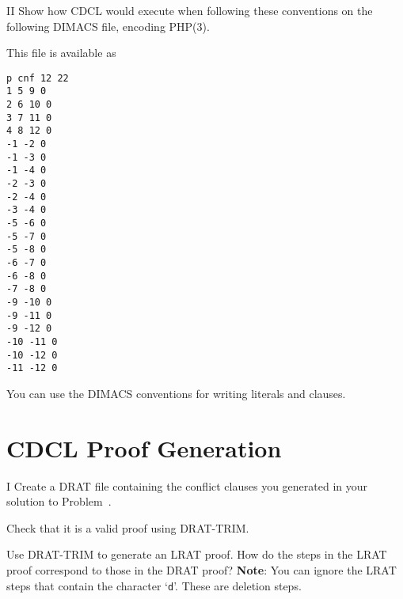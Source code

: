 \begin{problem}{II}
  Show how CDCL would execute when following these conventions on the following
  DIMACS file, encoding PHP(3).

  This file is available as 
\begin{lstlisting}
p cnf 12 22
1 5 9 0
2 6 10 0
3 7 11 0
4 8 12 0
-1 -2 0
-1 -3 0
-1 -4 0
-2 -3 0
-2 -4 0
-3 -4 0
-5 -6 0
-5 -7 0
-5 -8 0
-6 -7 0
-6 -8 0
-7 -8 0
-9 -10 0
-9 -11 0
-9 -12 0
-10 -11 0
-10 -12 0
-11 -12 0
\end{lstlisting}
  You can use the DIMACS conventions for writing literals and clauses.
  
\end{problem}

\newpage

\section*{CDCL Proof Generation}


\begin{problem}{I}
Create a DRAT file containing the conflict clauses you generated in your solution to Problem~.
\begin{choice}
\item
Check that it is a valid proof using DRAT-TRIM.
\item
Use DRAT-TRIM to generate an LRAT proof.  How do the steps in the LRAT proof correspond to those in the DRAT proof?
{\bf Note}: You can ignore the LRAT steps that contain the character `\texttt{d}'.  These are deletion steps.
\end{choice}
\end{problem}

